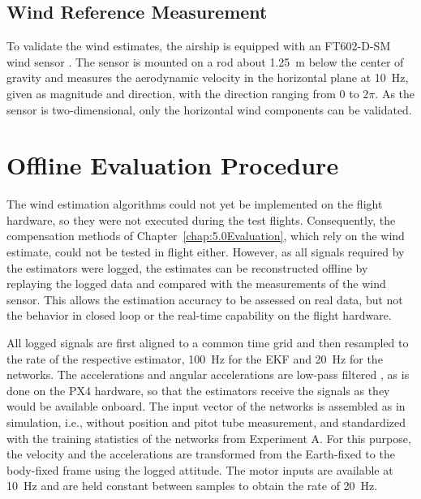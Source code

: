 \subsection{Wind Reference Measurement}
\label{sec:6.1.2WindSensor}

To validate the wind estimates, the airship is equipped with an FT602-D-SM wind sensor . The sensor is mounted on a rod about \SI{1.25}{\meter} below the center of gravity and measures the aerodynamic velocity in the horizontal plane at \SI{10}{\hertz}, given as magnitude and direction, with the direction ranging from $0$ to $2\pi$. As the sensor is two-dimensional, only the horizontal wind components can be validated.


\section{Offline Evaluation Procedure}
\label{sec:6.2OfflineProcedure}

The wind estimation algorithms could not yet be implemented on the flight hardware, so they were not executed during the test flights. Consequently, the compensation methods of Chapter~\ref{chap:5.0Evaluation}, which rely on the wind estimate, could not be tested in flight either. However, as all signals required by the estimators were logged, the estimates can be reconstructed offline by replaying the logged data and compared with the measurements of the wind sensor. This allows the estimation accuracy to be assessed on real data, but not the behavior in closed loop or the real-time capability on the flight hardware.

All logged signals are first aligned to a common time grid and then resampled to the rate of the respective estimator, \SI{100}{\hertz} for the EKF and \SI{20}{\hertz} for the networks. The accelerations and angular accelerations are low-pass filtered , as is done on the PX4 hardware, so that the estimators receive the signals as they would be available onboard. The input vector of the networks is assembled as in simulation, i.e., without position and pitot tube measurement, and standardized with the training statistics of the networks from Experiment A. For this purpose, the velocity and the accelerations are transformed from the Earth-fixed to the body-fixed frame using the logged attitude. The motor inputs are available at \SI{10}{\hertz} and are held constant between samples to obtain the rate of \SI{20}{\hertz}.

